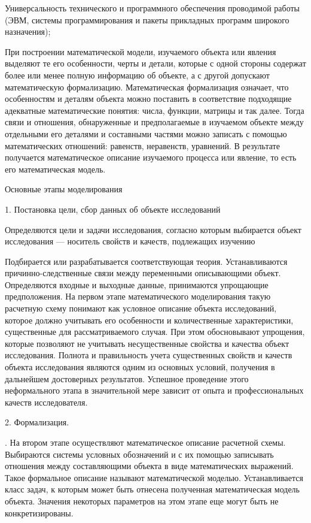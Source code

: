 Универсальность технического и программного обеспечения проводимой работы (ЭВМ, системы программирования и пакеты прикладных программ широкого назначения);


При построении математической модели, изучаемого объекта или явления выделяют те его особенности, черты и детали, которые с одной стороны содержат более или менее полную информацию об объекте, а с другой допускают математическую формализацию. Математическая формализация означает, что особенностям и деталям объекта можно поставить в соответствие подходящие адекватные математические понятия: числа, функции, матрицы и так далее. Тогда связи и отношения, обнаруженные и предполагаемые в изучаемом объекте между отдельными его деталями и составными частями можно записать с помощью математических отношений: равенств, неравенств, уравнений. В результате получается математическое описание изучаемого процесса или явление, то есть его математическая модель.


Основные этапы моделирования


1. Постановка цели, сбор данных об объекте исследований


Определяются цели и задачи исследования, согласно которым выбирается объект исследования — носитель свойств и качеств, подлежащих изучению 


 Подбирается или разрабатывается соответствующая теория. Устанавливаются причинно-следственные связи между переменными описывающими объект. Определяются входные и выходные данные, принимаются упрощающие предположения. На первом этапе математического моделирования такую расчетную схему понимают как условное описание объекта исследований, которое должно учитывать его особенности и количественные характеристики, существенные для рассматриваемого случая. При этом обосновывают упрощения, которые позволяют не учитывать несущественные свойства и качества объект исследования.
Полнота и правильность учета существенных свойств и качеств объекта исследования являются одним из основных условий, получения в дальнейшем достоверных результатов. Успешное проведение этого неформального этапа в значительной мере зависит от опыта и профессиональных качеств исследователя.


2. Формализация.


. На втором этапе осуществляют математическое описание расчетной схемы. Выбираются системы условных обозначений и с их помощью записывать отношения между составляющими объекта в виде математических выражений. Такое формальное описание называют математической моделью. Устанавливается класс задач, к которым может быть отнесена полученная математическая модель объекта. Значения некоторых параметров на этом этапе еще могут быть не конкретизированы.


